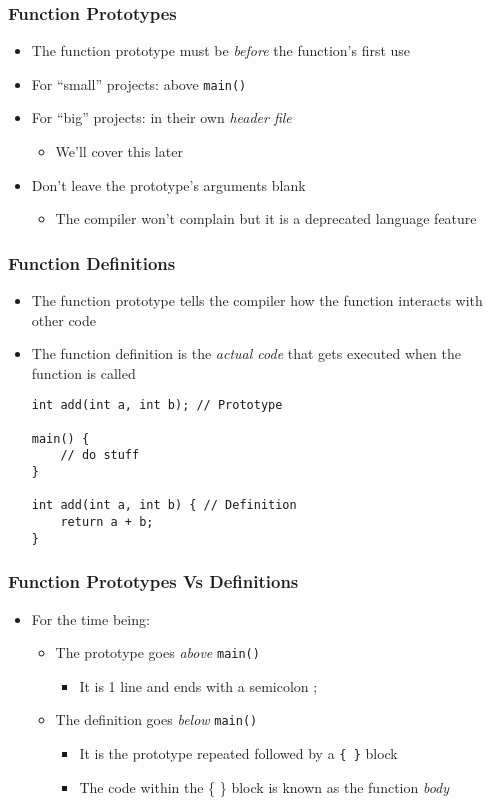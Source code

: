 \documentclass[14pt]{beamer}
\begin{document}
\begin{frame}
\frametitle{Function Prototypes}
\begin{itemize}
\item The function prototype must be \textit{before} the function's first use
\item For ``small'' projects: above \texttt{main()}
\item For ``big'' projects: in their own \textit{header file}
	\begin{itemize}
		\item We'll cover this later
	\end{itemize}
\item Don't leave the prototype's arguments blank
	\begin{itemize}
		\item The compiler won't complain but it is a deprecated language feature
	\end{itemize}
\end{itemize}
\end{frame}

\begin{frame}[fragile]
\frametitle{Function Definitions}
\begin{itemize}
\item The function prototype tells the compiler how the function interacts with other code
\item The function definition is the \textit{actual code} that gets executed when the function is called
\begin{lstlisting}[style=CStyle]
int add(int a, int b); // Prototype

main() {
	// do stuff
}

int add(int a, int b) { // Definition
	return a + b;
}
\end{lstlisting}
\end{itemize}
\end{frame}

\begin{frame}
\frametitle{Function Prototypes Vs Definitions}
\begin{itemize}
\item For the time being:
\begin{itemize}
	\item The prototype goes \textit{above} \texttt{main()}
		\begin{itemize}
			\item It is 1 line and ends with a semicolon ;
		\end{itemize}
	\item The definition goes \textit{below} \texttt{main()}
		\begin{itemize}
			\item It is the prototype repeated followed by a \texttt{\{ \}} block
			\item The code within the \{ \} block is known as the function \textit{body}
		\end{itemize}
\end{itemize}
\end{itemize}
\end{frame}
\end{document}
